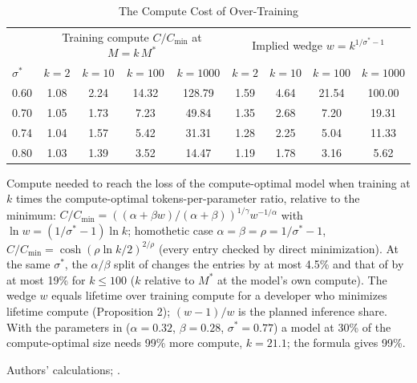 \begin{table}[tp]
\centering
\caption{The Compute Cost of Over-Training}
\label{tab:overhead}
\footnotesize
\setlength{\tabcolsep}{3pt}
\begin{tabular*}{\textwidth}{@{\extracolsep{\fill}}lcccccccc@{}}
\toprule
 & \multicolumn{4}{c}{Training compute $C/C_{\min}$ at $M=k\,M^*$} & \multicolumn{4}{c}{Implied wedge $w=k^{1/\sigma^*-1}$} \\
\cmidrule(lr){2-5}\cmidrule(l){6-9}
$\sigma^*$ & $k=2$ & $k=10$ & $k=100$ & $k=1000$ & $k=2$ & $k=10$ & $k=100$ & $k=1000$ \\
\midrule
0.60 & 1.08 & 2.24 & 14.32 & 128.79 & 1.59 & 4.64 & 21.54 & 100.00 \\
0.70 & 1.05 & 1.73 & 7.23 & 49.84 & 1.35 & 2.68 & 7.20 & 19.31 \\
0.74 & 1.04 & 1.57 & 5.42 & 31.31 & 1.28 & 2.25 & 5.04 & 11.33 \\
0.80 & 1.03 & 1.39 & 3.52 & 14.47 & 1.19 & 1.78 & 3.16 & 5.62 \\
\bottomrule
\end{tabular*}

\begin{tablenotes}
Compute needed to reach the loss of the compute-optimal model when training at $k$ times the compute-optimal tokens-per-parameter ratio, relative to the minimum: $C/C_{\min}=((\alpha+\beta w)/(\alpha+\beta))^{1/\gamma}w^{-1/\alpha}$ with $\ln w=(1/\sigma^*-1)\ln k$; homothetic case $\alpha=\beta=\rho=1/\sigma^*-1$, $C/C_{\min}=\cosh(\rho\ln k/2)^{2/\rho}$ (every entry checked by direct minimization). At the same $\sigma^*$, the $\alpha/\beta$ split of \citet{besiroglu2024chinchilla} changes the entries by at most 4.5\% and that of \citet{hoffmann2022training} by at most 19\% for $k\le100$ ($k$ relative to $M^*$ at the model's own compute). The wedge $w$ equals lifetime over training compute for a developer who minimizes lifetime compute (Proposition 2); $(w-1)/w$ is the planned inference share. With the parameters in \citet{devries2023go} ($\alpha=0.32$, $\beta=0.28$, $\sigma^*=0.77$) a model at 30\% of the compute-optimal size needs 99\% more compute, $k=21.1$; the formula gives 99\%.
\end{tablenotes}

\begin{tablenotes}[Source]
Authors' calculations; \citet{devries2023go}.
\end{tablenotes}
\end{table}

